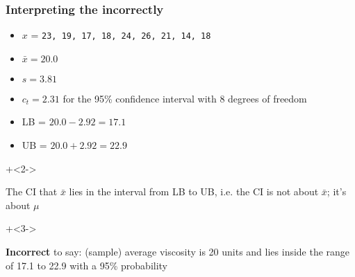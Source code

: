 \begin{frame}\frametitle{Interpreting the {\color{purple}{confidence interval (CI)}} {\color{red} incorrectly}}
	
	\begin{itemize}
		\item	$x$ = \texttt{23, 19, 17, 18, 24, 26, 21, 14, 18}
		\item	$\bar{x} = 20.0$
		\item	$s=3.81$
		\item	$c_t = 2.31$ for the 95\% confidence interval with 8 degrees of freedom
		\item	LB = $20.0 - 2.92 = 17.1$
		\item	UB = $20.0 + 2.92 = 22.9$
	\end{itemize}
	
	\myhrule
	\begin{itemize}
		\onslide+<2->{
			\item	The CI {} that $\bar{x}$ lies in the interval from LB to UB, i.e. the CI is not about $\bar{x}$; it's about $\mu$
		}
		\onslide+<3->{
			\item	{\color{red}\textbf{Incorrect}} to say: (sample) average viscosity is 20 units and lies inside the range of 17.1 to 22.9 with a 95\% probability
		}

	\end{itemize}
\end{frame}

